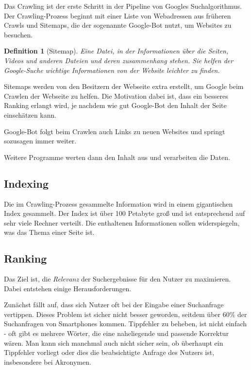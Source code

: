 \documentclass{article}
\newtheorem{definition}{Definition}
\begin{document}
Das Crawling ist der erste Schritt in der Pipeline von Googles Suchalgorithmus. Der Crawling-Prozess beginnt mit einer Liste von Webadressen aus früheren Crawls und Sitemaps, die der sogenannte Google-Bot nutzt, um Websites zu besuchen.

\begin{definition}[Sitemap]
Eine Datei, in der Informationen über die Seiten, Videos und anderen Dateien und deren zusammenhang stehen. Sie helfen der Google-Suche wichtige Informationen von der Website leichter zu finden.
\end{definition}

Sitemaps werden von den Besitzern der Webseite extra erstellt, um Google beim Crawlen der Webseite zu helfen. Die Motivation dabei ist, dass ein besseres Ranking erlangt wird, je nachdem wie gut Google-Bot den Inhalt der Seite einschätzen kann.

Google-Bot folgt beim Crawlen auch Links zu neuen Websites und springt sozusagen immer weiter.

Weitere Programme werten dann den Inhalt aus und verarbeiten die Daten.

\subsection{Indexing}

Die im Crawling-Prozess gesammelte Information wird in einem gigantischen Index gesammelt. Der Index ist über 100 Petabyte groß\cite{si} und ist entsprechend auf sehr viele Rechner verteilt. Die enthaltenen Informationen sollen widerspiegeln, was das Thema einer Seite ist.

\subsection{Ranking}

Das Ziel ist, die \textit{Relevanz} der Suchergebnisse für den Nutzer zu maximieren. Dabei entstehen einige Herausforderungen.

Zunächst fällt auf, dass sich Nutzer oft bei der Eingabe einer Suchanfrage vertippen. Dieses Problem ist sicher nicht besser geworden, seitdem über 60\% der Suchanfragen von Smartphones kommen\cite{mq}. Tippfehler zu beheben, ist nicht einfach - oft gibt es mehrere Wörter, die eine naheliegende und passende Korrektur wären. Man kann sich manchmal auch nicht sicher sein, ob überhaupt ein Tippfehler vorliegt oder dies die beabsichtigte Anfrage des Nutzers ist, insbesondere bei Akronymen.
\end{document}
